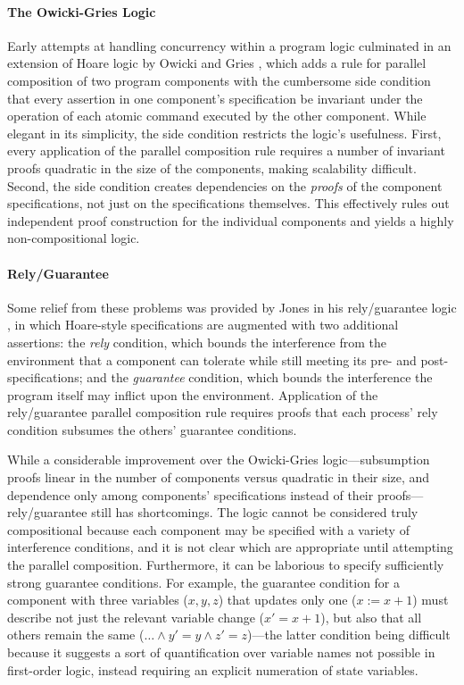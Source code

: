 \documentclass[11pt]{report}         %
\begin{document}
\paragraph{The Owicki-Gries Logic} Early attempts at handling concurrency within a program logic culminated in an extension of Hoare logic by Owicki and Gries \cite{DBLP:journals/cacm/OwickiG76}, which adds a rule for parallel composition of two program components with the cumbersome side condition that every assertion in one component's specification be invariant under the operation of each atomic command executed by the other component. While elegant in its simplicity, the side condition restricts the logic's usefulness. First, every application of the parallel composition rule requires a number of invariant proofs quadratic in the size of the components, making scalability difficult. Second, the side condition creates dependencies on the \emph{proofs} of the component specifications, not just on the specifications themselves. This effectively rules out independent proof construction for the individual components and yields a highly non-compositional logic.

\paragraph{Rely/Guarantee} Some relief from these problems was provided by Jones in his rely/guarantee logic \cite{JonesRelyGuar}, in which Hoare-style specifications are augmented with two additional assertions: the \emph{rely} condition, which bounds the interference from the environment that a component can tolerate while still meeting its pre- and post-specifications; and the \emph{guarantee} condition, which bounds the interference the program itself may inflict upon the environment. Application of the rely/guarantee parallel composition rule requires proofs that each process' rely condition subsumes the others' guarantee conditions.

While a considerable improvement over the Owicki-Gries logic---subsumption proofs linear in the number of components versus quadratic in their size, and dependence only among components' specifications instead of their proofs---rely/guarantee still has shortcomings. The logic cannot be considered truly compositional because each component may be specified with a variety of interference conditions, and it is not clear which are appropriate until attempting the parallel composition. Furthermore, it can be laborious to specify sufficiently strong guarantee conditions. For example, the guarantee condition for a component with three variables ($x,y,z$) that updates only one ($x := x+1$) must describe not just the relevant variable change ($x' = x + 1$), but also that all others remain the same ($\ldots \wedge y' = y \wedge z' = z$)---the latter condition being difficult because it suggests a sort of quantification over variable names not possible in first-order logic, instead requiring an explicit numeration of state variables.
\end{document}
